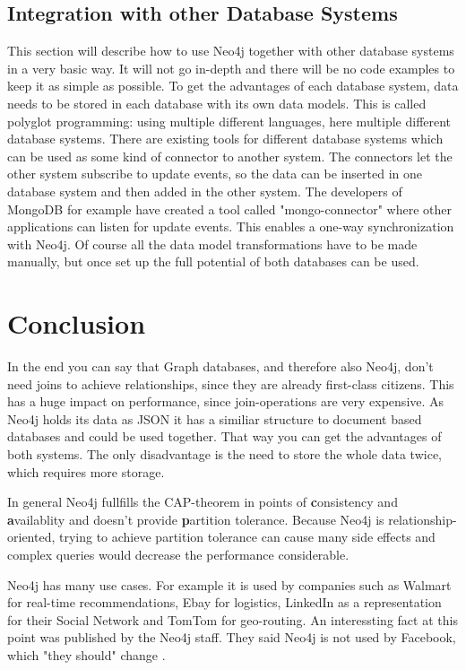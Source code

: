 \subsection{Integration with other Database Systems}
This section will describe how to use Neo4j together with other database systems in a very basic way. It will not go in-depth and there will be no code examples to keep it as simple as possible.
To get the advantages of each database system, data needs to be stored in each database with its own data models. This is called polyglot programming: using multiple different languages, here multiple different database systems. There are existing tools for different database systems which can be used as some kind of connector to another system. The connectors let the other system subscribe to update events, so the data can be inserted in one database system and then added in the other system. The developers of MongoDB for example have created a tool called "mongo-connector" where other applications can listen for update events. This enables a one-way synchronization with Neo4j. Of course all the data model transformations have to be made manually, but once set up the full potential of both databases can be used. \cite["Goals", para. 1]{NeoTechnologyInc.2017h}

\section{Conclusion}

In the end you can say that Graph databases, and therefore also Neo4j, don't need joins to achieve relationships, since they are already first-class citizens. This has a huge impact on performance, since join-operations are very expensive.
As Neo4j holds its data as JSON it has a similiar structure to document based databases and could be used together. That way you can get the advantages of both systems. The only disadvantage is the need to store the whole data twice, which requires more storage.

In general Neo4j fullfills the CAP-theorem in points of \textbf{c}onsistency and \textbf{a}vailablity and doesn't provide \textbf{p}artition tolerance. Because Neo4j is relationship-oriented, trying to achieve partition tolerance can cause many side effects and complex queries would decrease the performance considerable.

Neo4j has many use cases. For example it is used by companies such as Walmart for real-time recommendations, Ebay for logistics, LinkedIn as a representation for their Social Network and TomTom for geo-routing. An interessting fact at this point was published by the Neo4j staff. They said Neo4j is not used by Facebook, which "they should" change \cite[para. 5]{Neo4jStaff.2011}.

